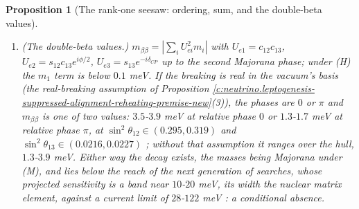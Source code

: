 \documentclass[11pt]{article}
\newtheorem{proposition}[theorem]{Proposition}
\theoremstyle{definition}
\theoremstyle{plain}
\begin{document}
\begin{proposition}[The rank-one seesaw: ordering, sum, and the double-beta values]
\begin{enumerate}
\item \emph{(The double-beta values.)} $m_{\beta\beta} = |\sum_{i}U_{ei}^{2}m_{i}|$ with $U_{e1} = c_{12}c_{13}$, $U_{e2} = s_{12}c_{13}e^{i\phi/2}$, $U_{e3} = s_{13}e^{-i\delta_{CP}}$ up to the second Majorana phase; under (H) the $m_{1}$ term is below $0.1$ meV. If the breaking is real in the vacuum's basis (the real-breaking assumption of Proposition \ref{c:neutrino.leptogenesis-suppressed-alignment-reheating-premise-new}(3)), the phases are $0$ or $\pi$ and $m_{\beta\beta}$ is one of two values: $3.5$-$3.9$ meV at relative phase $0$ or $1.3$-$1.7$ meV at relative phase $\pi$, at $\sin^{2}\theta_{12} \in (0.295, 0.319)$ and $\sin^{2}\theta_{13} \in (0.0216, 0.0227)$ \cite{NuFIT2024}; without that assumption it ranges over the hull, $1.3$-$3.9$ meV. Either way the decay exists, the masses being Majorana under (M), and lies below the reach of the next generation of searches, whose projected sensitivity is a band near $10$-$20$ meV, its width the nuclear matrix element, against a current limit of $28$-$122$ meV \cite{LEGEND2021, KamLANDZen2023}: a conditional absence.
\end{enumerate}
\end{proposition}
\end{document}
